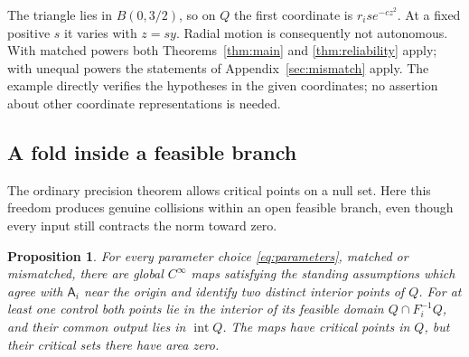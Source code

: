 \documentclass[11pt]{amsart}
\newtheorem{proposition}[theorem]{Proposition}
\theoremstyle{definition}
\theoremstyle{remark}
\numberwithin{equation}{section}
\begin{document}
The triangle lies in $B(0,3/2)$, so on $Q$ the first coordinate
is $r_i s e^{-cz^2}$. At a fixed positive $s$ it varies with
$z=sy$. Radial motion is consequently not autonomous. With
matched powers both Theorems~\ref{thm:main} and
\ref{thm:reliability} apply; with unequal powers the statements
of Appendix~\ref{sec:mismatch} apply. The example directly verifies
the hypotheses in the given coordinates; no assertion about other
coordinate representations is needed.

\subsection{A fold inside a feasible branch}\label{sec:fold}
The ordinary precision theorem allows critical points on a null set.
Here this freedom produces genuine collisions within an open feasible
branch, even though every input still contracts the norm toward zero.
\begin{proposition}\label{prop:fold}
For every parameter choice \eqref{eq:parameters}, matched or
mismatched, there are global $C^\infty$ maps satisfying the
standing assumptions which agree with $\mathsf A_i$ near the origin
and identify two distinct interior points of $Q$. For at least
one control both points lie in the interior of its feasible domain
$Q\cap F_i^{-1}Q$, and their common output lies in $\operatorname{int}Q$.
The maps have critical points in $Q$, but their critical sets
there have area zero.
\end{proposition}
\end{document}
